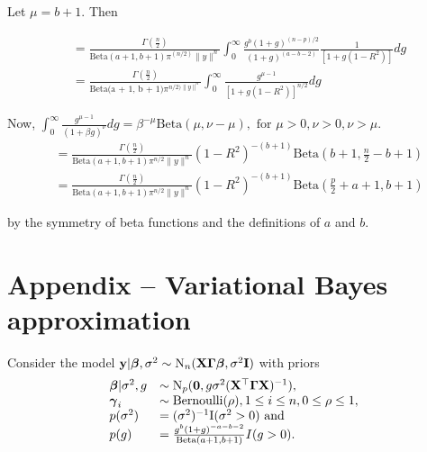 \documentclass{amsart}[12pt]
\begin{document}
Let $\mu = b + 1$. Then

\begin{equation*}
\begin{array}{ll}
&=\frac{\Gamma(\frac{n}{2})}{\text{Beta}(a + 1,  b + 1) \pi^(n/2) \| y \|^n}
\int_0^\infty \frac{g^b(1 + g)^{(n - p)/2}}{(1 + g)^{(a - b - 2)}} \frac{1}{[1 + g(1 - R^2)]} dg \\
&= \frac{\Gamma(\frac{n}{2})}{\text{Beta(a + 1, b + 1)} \pi^{n/2) \| y \|^n}}
\int_0^\infty \frac{g^{\mu - 1}}{[1 + g (1 - R^2)]^{n/2}} dg
\end{array}
\end{equation*}

Now, $\int_0^\infty \frac{g^{\mu - 1}}{(1 + \beta g)^\nu} dg = \beta^{-\mu} \text{Beta}(\mu, \nu - \mu), \text{ for } \mu > 0, \nu > 0, \nu > \mu$.
\begin{equation*}
\begin{array}{ll}
&= \frac{\Gamma(\frac{n}{2})}{\text{Beta}(a + 1, b + 1) \pi^{n / 2} \| y \|^n} (1 - R^2)^{-(b + 1)} \text{Beta}(b + 1, \frac{n}{2} - b + 1) \\
&= \frac{\Gamma(\frac{n}{2})}{\text{Beta}(a + 1, b + 1) \pi^{n / 2} \| y \|^n} (1 - R^2)^{-(b + 1)} \text{Beta}(\frac{p}{2} + a + 1, b + 1)
\end{array}
\end{equation*}

by the symmetry of beta functions and the definitions of $a$ and $b$.

\section{Appendix -- Variational Bayes approximation}

\def \I {\text{I}}

Consider the model ${\bf y} | {\boldsymbol \beta}, \sigma^2 \sim \text{N}_n({\bf X} {\boldsymbol \Gamma} {\boldsymbol \beta}, \sigma^2 {\bf I})$ with
priors
\begin{equation*}
\begin{array}{ll}
\vbeta | \sigma^2, g &\sim \text{N}_p(\vzero, g \sigma^2(\mX^\top \mGamma \mX)^{-1}), \\
\vgamma_i &\sim \text{Bernoulli}(\rho), 1 \leq i \leq n, 0 \leq \rho \leq 1, \\
p(\sigma^2) &= (\sigma^2)^{-1} \I(\sigma^2 > 0) \text{ and }\\
p(g) &= \frac{g^b (1 + g)^{-a - b - 2}}{\text{Beta}(a + 1, b + 1)} I(g > 0).
\end{array}
\end{equation*}
\end{document}
